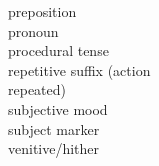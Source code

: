 \documentclass[output=paper,colorlinks,citecolor=brown
]{langscibook}
\begin{document}
\begin{multicols}{2}
\begin{tabbing}
\PREP{} \> preposition \\
\PRO{} \> pronoun \\
\PROC{} \> procedural tense \\
\REP{} \> repetitive suffix (action \\ \> repeated) \\ 
\SBJV{} \> subjective mood \\
\SM{} \> subject marker \\
\VEN{} \> venitive/hither
\end{tabbing}
\end{multicols}

\printbibliography[heading=subbibliography,notkeyword=this]
\end{document}
